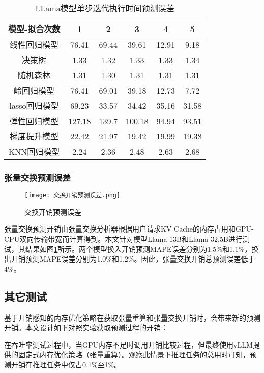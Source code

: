 \begin{table}[H]
  \centering
  \caption{LLama模型单步迭代执行时间预测误差}
  \label{Table:LLama模型单步迭代执行时间预测误差}
  \renewcommand{\arraystretch}{1.3}
  \small
  \begin{tabular}{c c c c c c}
    \toprule
    \textbf{模型-拟合次数} & \textbf{1} & \textbf{2} & \textbf{3} & \textbf{4} & \textbf{5} \\
    \midrule
    线性回归模型 & 76.41 & 69.44 & 39.61 & 12.91 & 9.18 \\ 
    决策树 & 1.33 & 1.32 & 1.33 & 1.33 & 1.34 \\ 
    随机森林 & 1.31 & 1.30 & 1.31 & 1.31 & 1.31 \\ 
    岭回归模型 & 76.41 & 69.01 & 39.18 & 12.73 & 7.72 \\ 
    lasso回归模型 & 69.23 & 33.57 & 34.42 & 35.16 & 31.58  \\ 
    弹性回归模型 & 127.18 & 139.7 & 100.18 & 94.94 & 93.51  \\ 
    梯度提升模型 & 22.42 & 21.97 & 19.42 & 19.99 & 19.38  \\ 
    KNN回归模型 & 2.24 & 2.36 & 2.48 & 2.63 & 2.68 \\ 
    \bottomrule
  \end{tabular}
\end{table}


\subsubsection{张量交换预测误差}

\begin{figure}[!htbp]
  \centering
  \texttt{[image: 交换开销预测误差.png]}
  \caption{交换开销预测误差}
  \label{Fig:交换开销预测误差}
\end{figure}

张量交换预测开销由张量交换分析器根据用户请求KV Cache的内存占用和GPU-CPU双向传输带宽而计算得到。本文针对模型Llama-13B和Llama-32.5B进行测试，其结果如图\ref{Fig:交换开销预测误差}所示。两个模型换入开销预测MAPE误差分别为1.5\%和1.1\%，换出开销预测MAPE误差分别为1.0\%和1.2\%。因此，张量交换开销总预测误差低于4\%。

\subsection{其它测试}

基于开销感知的内存优化策略在获取张量重算和张量交换开销时，会带来新的预测开销。本文设计如下对照实验获取预测过程的开销：

在吞吐率测试过程中，当GPU内存不足时调用开销比较过程，但最终使用vLLM提供的固定式内存优化策略（张量重算）。观察此情景下推理任务的总用时可知，预测开销在推理任务中仅占0.1\%至1\%。


